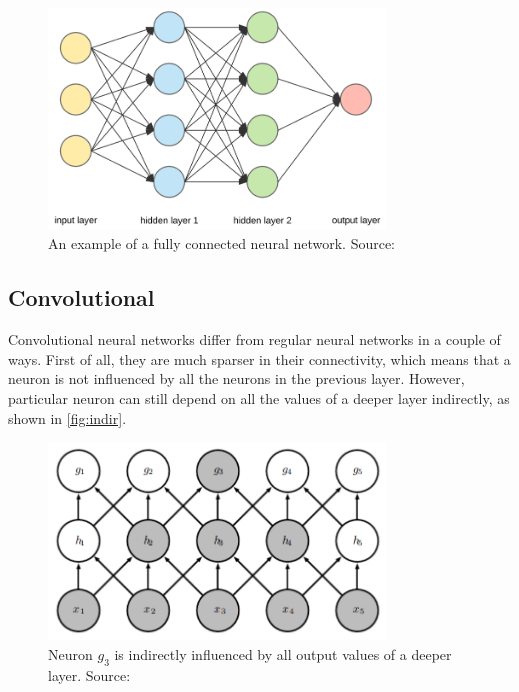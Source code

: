 \documentclass{article}
\begin{document}
\begin{figure}
    \centering
    \includegraphics[width=0.8\textwidth]{images/fullyNet.png}
    \caption{An example of a fully connected neural network. Source: \cite{fullpic}}
    \label{fig:full}
\end{figure}

\subsection{Convolutional}

Convolutional neural networks differ from regular neural networks in a couple of ways. First of all, they are much sparser in their connectivity, which means that a neuron is not influenced by all the neurons in the previous layer. However, particular neuron can still depend on all the values of a deeper layer indirectly, as shown in \autoref{fig:indir}.\\

\begin{figure}
    \centering
    \includegraphics[width=0.8\textwidth]{images/indir.png}
    \caption{Neuron $g_3$ is indirectly influenced by all output values of a deeper layer. Source: \cite{dl-book}}
    \label{fig:indir}
\end{figure}
\end{document}
